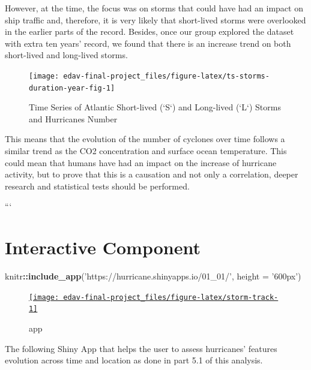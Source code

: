\documentclass[]{book}
\newenvironment{Shaded}{\begin{snugshade}}{\end{snugshade}}
\newcommand{\DataTypeTok}[1]{\textcolor[rgb]{0.13,0.29,0.53}{#1}}
\newcommand{\KeywordTok}[1]{\textcolor[rgb]{0.13,0.29,0.53}{\textbf{#1}}}
\newcommand{\NormalTok}[1]{#1}
\newcommand{\OperatorTok}[1]{\textcolor[rgb]{0.81,0.36,0.00}{\textbf{#1}}}
\newcommand{\StringTok}[1]{\textcolor[rgb]{0.31,0.60,0.02}{#1}}
\begin{document}
However, at the time, the focus was on storms that could have had an impact on ship traffic and, therefore, it is very likely that short-lived storms were overlooked in the earlier parts of the record. Besides, once our group explored the dataset with extra ten years' record, we found that there is an increase trend on both short-lived and long-lived storms.

\begin{figure}

{\centering \texttt{[image: edav-final-project\_files/figure-latex/ts-storms-duration-year-fig-1]} 

}

\caption{Time Series of Atlantic Short-lived (`S`) and Long-lived (`L`) Storms and Hurricanes Number}\label{fig:ts-storms-duration-year-fig}
\end{figure}

This means that the evolution of the number of cyclones over time follows a similar trend as the CO2 concentration and surface ocean temperature. This could mean that humans have had an impact on the increase of hurricane activity, but to prove that this is a causation and not only a correlation, deeper research and statistical tests should be performed.

```

\hypertarget{intercom}{%
\chapter{Interactive Component}\label{intercom}}

\begin{Shaded}
\begin{Highlighting}[]
\NormalTok{knitr}\OperatorTok{::}\KeywordTok{include_app}\NormalTok{(}\StringTok{'https://hurricane.shinyapps.io/01_01/'}\NormalTok{, }\DataTypeTok{height =} \StringTok{'600px'}\NormalTok{)}
\end{Highlighting}
\end{Shaded}

\begin{figure}

{\centering \href{https://hurricane.shinyapps.io/01_01/}{\texttt{[image: edav-final-project\_files/figure-latex/storm-track-1]} }

}

\caption{app}\label{fig:storm-track}
\end{figure}

The following Shiny App that helps the user to assess hurricanes' features evolution across time and location as done in part 5.1 of this analysis.
\end{document}
